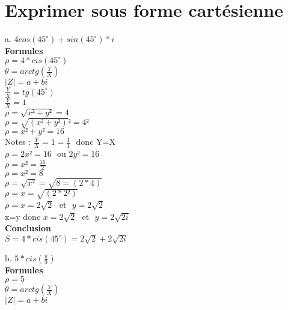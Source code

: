 \section{Exprimer sous forme cartésienne}
\vspace{3mm} %

a. $4cos(45^{\circ}) + sin(45^{\circ}) *i$ \\

\textbf{Formules} \\
$\rho = 4 * cis(45^{\circ})$\\
$\theta = arctg(\frac{Y}{X})$ \\
$|Z| = a+bi $\\

\vspace{3mm} %
$\frac{Y}{X} = tg(45^{\circ})$\\
$\frac{Y}{X} = 1$\\

$\rho = \sqrt{x²+y²} = 4$\\
$\rho = \sqrt{(x²+y²)}² = 4²$\\
$\rho = x²+y² = 16$\\

Notes : $\frac{Y}{X} = 1 = \frac{1}{1}$ $ $ donc Y=X \\

$\rho = 2x² = 16$ $ $ ou $ 2y² = 16$ \\
$\rho = x² = \frac{16}{2}$ \\
$\rho = x² = 8$ \\
$\rho = \sqrt{x²} = \sqrt{8 = (2*4)}$ \\
$\rho = x = \sqrt{(2*2²)}$ \\
$\rho = x = 2\sqrt{2}$ $ $ et $ $ $ y=2\sqrt{2} $\\

x=y donc $x = 2\sqrt{2}$ $ $ et $ $ $ y=2\sqrt{2i} $ \\

\textbf{Conclusion}\\

$ S= 4 * cis(45^{\circ}) = 2\sqrt{2} + 2\sqrt{2i}$

\newpage

b. $5 * cis(\frac{\pi}{3})$ \\

\textbf{Formules} \\

$\rho = 5 $\\
$\theta = arctg(\frac{Y}{X})$ \\
$|Z| = a+bi $\\

